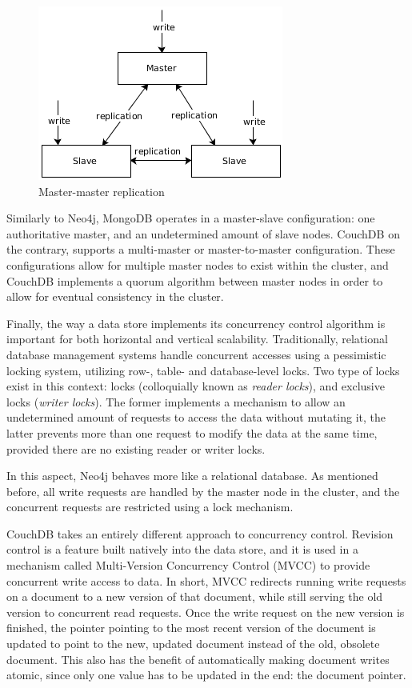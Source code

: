 \begin{figure}
  \centering
  \includegraphics[width=.4\textwidth]{img/replication-master-master.png}
  \caption{Master-master replication}
  \label{fig:replication-master-master}
\end{figure}

Similarly to Neo4j, MongoDB operates in a master-slave configuration: one authoritative master, and an undetermined amount of slave nodes.
CouchDB on the contrary, supports a multi-master or master-to-master configuration.
These configurations allow for multiple master nodes to exist within the cluster, and CouchDB implements a quorum algorithm between master nodes in order to allow for eventual consistency in the cluster.

Finally, the way a data store implements its concurrency control algorithm is important for both horizontal and vertical scalability.
Traditionally, relational database management systems handle concurrent accesses using a pessimistic locking system, utilizing row-, table- and database-level locks.
Two type of locks exist in this context:  locks (colloquially known as \textit{reader locks}), and exclusive locks (\textit{writer locks}).
The former implements a mechanism to allow an undetermined amount of requests to access the data without mutating it, the latter prevents more than one request to modify the data at the same time, provided there are no existing reader or writer locks.

In this aspect, Neo4j behaves more like a relational database.
As mentioned before, all write requests are handled by the master node in the cluster, and the concurrent requests are restricted using a lock mechanism.

CouchDB takes an entirely different approach to concurrency control.
Revision control is a feature built natively into the data store, and it is used in a mechanism called Multi-Version Concurrency Control (MVCC) to provide concurrent write access to data.
In short, MVCC redirects running write requests on a document to a new version of that document, while still serving the old version to concurrent read requests.
Once the write request on the new version is finished, the pointer pointing to the most recent version of the document is updated to point to the new, updated document instead of the old, obsolete document.
This also has the benefit of automatically making document writes atomic, since only one value has to be updated in the end: the document pointer.

